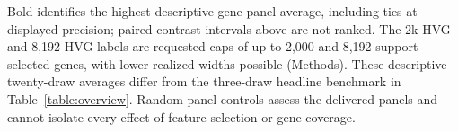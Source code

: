 Bold identifies the highest descriptive gene-panel average, including ties at displayed precision; paired contrast intervals above are not ranked. The 2k-HVG and 8,192-HVG labels are requested caps of up to 2,000 and 8,192 support-selected genes, with lower realized widths possible (Methods). These descriptive twenty-draw averages differ from the three-draw headline benchmark in Table~\ref{table:overview}. Random-panel controls assess the delivered panels and cannot isolate every effect of feature selection or gene coverage.